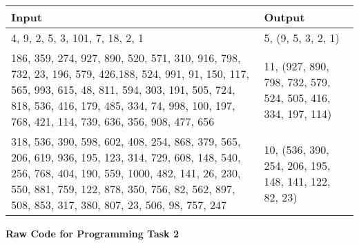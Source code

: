 \documentclass[12pt,letterpaper,final]{report}
\begin{document}
\begin{center}
\begin{tabular}{ | m{25em} | m{10em}| } 
  \hline
        \textbf{Input} & \textbf{Output}\\ 
  \hline
        4, 9, 2, 5, 3, 101, 7, 18, 2, 1 & 5, (9, 5, 3, 2, 1)\\
    \hline 
        186, 359, 274, 927, 890, 520, 571, 310, 916, 798, 732, 23, 196, 579, 426,188, 524, 991, 91, 150, 117, 565, 993, 615, 48, 811, 594, 303, 191, 505, 724, 818, 536, 416, 179, 485, 334, 74, 998, 100, 197, 768, 421, 114, 739, 636, 356, 908, 477, 656 & 11, (927, 890, 798, 732, 579, 524, 505, 416, 334, 197, 114)\\
    \hline
        318, 536, 390, 598, 602, 408, 254, 868, 379, 565, 206, 619, 936, 195, 123, 314, 729, 608, 148, 540, 256, 768, 404, 190, 559, 1000, 482, 141, 26, 230, 550, 881, 759, 122, 878, 350, 756, 82, 562, 897, 508, 853, 317, 380, 807, 23, 506, 98, 757, 247 & 10, (536, 390, 254, 206, 195, 148, 141, 122, 82, 23)\\
    \hline
\end{tabular}
\end{center}

\pagebreak



\textbf{Raw Code for Programming Task 2}

\lstset{
    basicstyle=\ttfamily\footnotesize,
    breaklines=true,  %
    frame=single,     %
    tabsize=4,        %
    showstringspaces=false %
}
\end{document}
